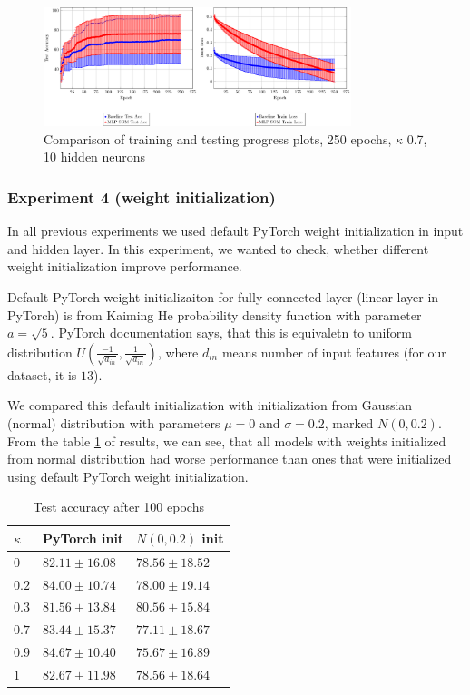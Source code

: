 \begin{figure}[h!]
    \centering
    \includegraphics[width=0.8\textwidth]{figs/baseline-model-tr-test-metrices-small-250ep.pdf}
    \caption{Comparison of training and testing progress plots, 250 epochs, $\kappa$ 0.7, 10 hidden neurons}
    \label{exp3-graphs}
\end{figure}


\newpage
\subsubsection{Experiment 4 (weight initialization)}

In all previous experiments we used default PyTorch weight initialization in input and hidden layer. In this experiment, we wanted to check, whether different weight initialization improve performance.

Default PyTorch weight initializaiton for fully connected layer (linear layer in PyTorch) is from Kaiming He probability density function with parameter $a = \sqrt{5}$. PyTorch documentation says, that this is equivaletn to uniform distribution $U(\frac{-1}{\sqrt{d_{in}}}, \frac{1}{\sqrt{d_{in}}})$, where $d_{in}$ means number of input features (for our dataset, it is $13$).

We compared this default initialization with initialization from Gaussian (normal) distribution with parameters $\mu = 0$ and $\sigma = 0.2$, marked $N(0, 0.2)$. From the table \ref{exp4-res-table} of results, we can see, that all models with weights initialized from normal distribution had worse performance than ones that were initialized using default PyTorch weight initialization. 


\begin{table}[h!]
\centering
\begin{tabular}{|l|l|l|}
\hline
$\kappa$        & PyTorch init & $N(0, 0.2)$ init \\ \hline
$0$   &  $82.11	\pm 16.08$ &  $78.56	\pm 18.52$ \\ \hline
$0.2$ &  $84.00	\pm 10.74$ &  $78.00	\pm 19.14$  \\ \hline
$0.3$ &  $81.56	\pm 13.84$ & \color{purple} $80.56	\pm 15.84$  \\ \hline
$0.7$ &  $83.44	\pm 15.37$ &  $77.11	\pm 18.67$  \\ \hline
$0.9$ &  \color{purple} $84.67	\pm 10.40$ &  $75.67	\pm 16.89$  \\ \hline
$1$   &  $82.67	\pm 11.98$ &  $78.56	\pm 18.64$   \\ \hline

\end{tabular}
\caption{Test accuracy after 100 epochs}
\label{exp4-res-table}
\end{table}


